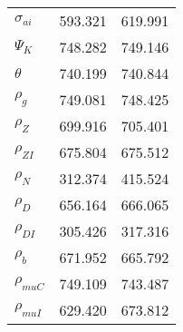 \begin{center}
\begin{longtable}{lcc}
$ {\sigma_{ai}}        $	 & 	     593.321	 & 	     619.991 \\ 
$ {\Psi_{K}}           $	 & 	     748.282	 & 	     749.146 \\ 
$ {\theta}             $	 & 	     740.199	 & 	     740.844 \\ 
$ {\rho_g}             $	 & 	     749.081	 & 	     748.425 \\ 
$ {\rho_Z}             $	 & 	     699.916	 & 	     705.401 \\ 
$ {\rho_{ZI}}          $	 & 	     675.804	 & 	     675.512 \\ 
$ {\rho_N}             $	 & 	     312.374	 & 	     415.524 \\ 
$ {\rho_D}             $	 & 	     656.164	 & 	     666.065 \\ 
$ {\rho_{DI}}          $	 & 	     305.426	 & 	     317.316 \\ 
$ {\rho_b}             $	 & 	     671.952	 & 	     665.792 \\ 
$ {\rho_{muC}}         $	 & 	     749.109	 & 	     743.487 \\ 
$ {\rho_{muI}}         $	 & 	     629.420	 & 	     673.812 \\ 
\end{longtable}
 \end{center}
